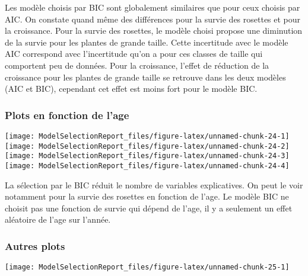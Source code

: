 \documentclass[
]{article}
\begin{document}
Les modèle choisis par BIC sont globalement similaires que pour ceux
choisis par AIC. On constate quand même des différences pour la survie
des rosettes et pour la croissance. Pour la survie des rosettes, le
modèle choisi propose une diminution de la survie pour les plantes de
grande taille. Cette incertitude avec le modèle AIC correspond avec
l'incertitude qu'on a pour ces classes de taille qui comportent peu de
données. Pour la croissance, l'effet de réduction de la croissance pour
les plantes de grande taille se retrouve dans les deux modèles (AIC et
BIC), cependant cet effet est moins fort pour le modèle BIC.

\subsubsection{Plots en fonction de
l'age}\label{plots-en-fonction-de-lage-1}

\texttt{[image: ModelSelectionReport\_files/figure-latex/unnamed-chunk-24-1]}
\texttt{[image: ModelSelectionReport\_files/figure-latex/unnamed-chunk-24-2]}
\texttt{[image: ModelSelectionReport\_files/figure-latex/unnamed-chunk-24-3]}
\texttt{[image: ModelSelectionReport\_files/figure-latex/unnamed-chunk-24-4]}

La sélection par le BIC réduit le nombre de variables explicatives. On
peut le voir notamment pour la survie des rosettes en fonction de l'age.
Le modèle BIC ne choisit pas une fonction de survie qui dépend de l'age,
il y a seulement un effet aléatoire de l'age sur l'année.

\subsubsection{Autres plots}\label{autres-plots-1}

\texttt{[image: ModelSelectionReport\_files/figure-latex/unnamed-chunk-25-1]}
\end{document}

